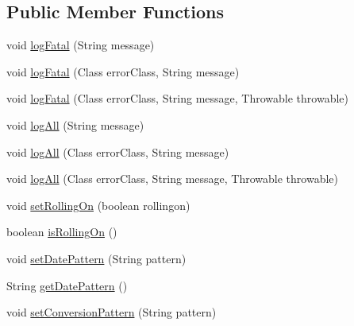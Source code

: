 \subsection*{Public Member Functions}
\begin{DoxyCompactItemize}
\item 
void \mbox{\hyperlink{interfacecom_1_1dlinkddns_1_1atulsaurabh_1_1erpecosystem_1_1logger_1_1_logger_ab1796d8ce066433e34409055fd5e7100}{log\+Fatal}} (String message)
\item 
void \mbox{\hyperlink{interfacecom_1_1dlinkddns_1_1atulsaurabh_1_1erpecosystem_1_1logger_1_1_logger_ae9763257a2db31ecdfd4675bcdcd3bd0}{log\+Fatal}} (Class error\+Class, String message)
\item 
void \mbox{\hyperlink{interfacecom_1_1dlinkddns_1_1atulsaurabh_1_1erpecosystem_1_1logger_1_1_logger_ad8e4ea32b41f7d225b8ea824af177a43}{log\+Fatal}} (Class error\+Class, String message, Throwable throwable)
\item 
void \mbox{\hyperlink{interfacecom_1_1dlinkddns_1_1atulsaurabh_1_1erpecosystem_1_1logger_1_1_logger_a45d119fc284eee3233ca247ec5f92e4c}{log\+All}} (String message)
\item 
void \mbox{\hyperlink{interfacecom_1_1dlinkddns_1_1atulsaurabh_1_1erpecosystem_1_1logger_1_1_logger_a232415e10e9da278b0bacf82309aef76}{log\+All}} (Class error\+Class, String message)
\item 
void \mbox{\hyperlink{interfacecom_1_1dlinkddns_1_1atulsaurabh_1_1erpecosystem_1_1logger_1_1_logger_aba1204d7d2383973ddf63e537e11086d}{log\+All}} (Class error\+Class, String message, Throwable throwable)
\item 
void \mbox{\hyperlink{interfacecom_1_1dlinkddns_1_1atulsaurabh_1_1erpecosystem_1_1logger_1_1_logger_af32bfcb68d536836f7bdb8618e4c1812}{set\+Rolling\+On}} (boolean rollingon)
\item 
boolean \mbox{\hyperlink{interfacecom_1_1dlinkddns_1_1atulsaurabh_1_1erpecosystem_1_1logger_1_1_logger_ae42fbcc81564437b6582b4c7ede3352b}{is\+Rolling\+On}} ()
\item 
void \mbox{\hyperlink{interfacecom_1_1dlinkddns_1_1atulsaurabh_1_1erpecosystem_1_1logger_1_1_logger_aceef18a85b09966b1ccf10c9927d0917}{set\+Date\+Pattern}} (String pattern)
\item 
String \mbox{\hyperlink{interfacecom_1_1dlinkddns_1_1atulsaurabh_1_1erpecosystem_1_1logger_1_1_logger_aab0359e92db242d1e64da4fc0b0fd638}{get\+Date\+Pattern}} ()
\item 
void \mbox{\hyperlink{interfacecom_1_1dlinkddns_1_1atulsaurabh_1_1erpecosystem_1_1logger_1_1_logger_add9a38d7fa3907aa924bdfe56f3fe5c3}{set\+Conversion\+Pattern}} (String pattern)

\end{DoxyCompactItemize}
